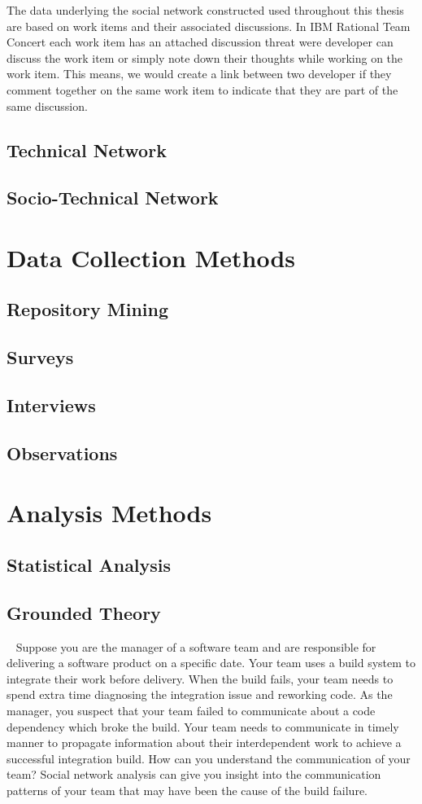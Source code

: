The data underlying the social network constructed used throughout this thesis are based on work items and their associated discussions.
In IBM Rational Team Concert each work item has an attached discussion threat were developer can discuss the work item or simply note down their thoughts while working on the work item.
This means, we would create a link between two developer if they comment together on the same work item to indicate that they are part of the same discussion.

\subsection{Technical Network}
\subsection{Socio-Technical Network}

\section{Data Collection Methods}
\subsection{Repository Mining}
\subsection{Surveys}
\subsection{Interviews}
\subsection{Observations}

\section{Analysis Methods}
\subsection{Statistical Analysis}
\subsection{Grounded Theory}

\newpage\ \newpage
Suppose you are the manager of a software team and are responsible for delivering
a software product on a specific date. Your team uses a build system to integrate
their work before delivery. When the build fails, your team needs to spend extra
time diagnosing the integration issue and reworking code. As the manager, you
suspect that your team failed to communicate about a code dependency which broke
the build. Your team needs to communicate in timely manner to propagate
information about their interdependent work to achieve a successful integration
build. How can you understand the communication of your team? Social network
analysis can give you insight into the communication patterns of your team that
may have been the cause of the build failure.

